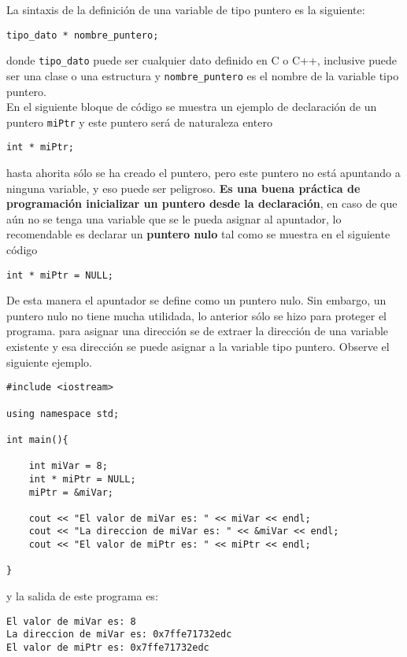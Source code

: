 \documentclass[12pt]{extarticle}
\newcommand{\<}{\langle}
\renewcommand{\>}{\rangle}
\theoremstyle{definition}
\begin{document}
La sintaxis de la definición de una variable de tipo puntero es la siguiente: 
\begin{lstlisting}
tipo_dato * nombre_puntero;
\end{lstlisting}
donde \verb|tipo_dato| puede ser cualquier dato definido en C o C++, inclusive puede ser una clase o una estructura y \verb|nombre_puntero| es el nombre de la variable tipo puntero.\\

En el siguiente bloque de código se muestra un ejemplo de declaración de un puntero \verb|miPtr| y este puntero  será de naturaleza entero
\begin{lstlisting}
int * miPtr;
\end{lstlisting}
hasta ahorita sólo se ha creado el puntero, pero este puntero no está apuntando a ninguna variable, y eso puede ser peligroso. \textbf{Es una buena práctica de programación inicializar un puntero desde la declaración}, en caso de que aún no se tenga una variable que se le pueda asignar al apuntador, lo recomendable es declarar un \textbf{puntero nulo} tal como se muestra en el siguiente código

\begin{lstlisting}
int * miPtr = NULL;
\end{lstlisting}

De esta manera el apuntador se define como un puntero nulo. Sin embargo, un puntero nulo no tiene mucha utilidada, lo anterior sólo se hizo para proteger el programa. para asignar una dirección  se de extraer la dirección de una variable existente y esa dirección se puede asignar a la variable tipo puntero. Observe el siguiente ejemplo.

\begin{lstlisting}
#include <iostream>

using namespace std;

int main(){
	
	int miVar = 8;
	int * miPtr = NULL;
	miPtr = &miVar;
	
	cout << "El valor de miVar es: " << miVar << endl; 
	cout << "La direccion de miVar es: " << &miVar << endl;
	cout << "El valor de miPtr es: " << miPtr << endl; 
	
}
\end{lstlisting}

y la salida de este programa es: 

\begin{lstlisting}
El valor de miVar es: 8
La direccion de miVar es: 0x7ffe71732edc
El valor de miPtr es: 0x7ffe71732edc
\end{lstlisting}
\end{document}
